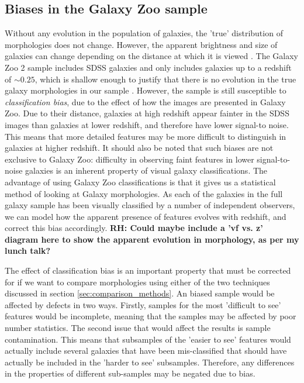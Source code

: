 \documentclass[useAMS,usenatbib]{mn2e}
\newcommand{\rh}[1]{{\bf \textcolor{RoyalPurple}{RH: #1}}}
\begin{document}
\subsection{Biases in the Galaxy Zoo sample}
Without any evolution in the population of galaxies, the 'true' distribution of morphologies does not change. However, the apparent brightness and size of galaxies can change depending on the distance at which it is viewed \citep{Bamford_09}. The Galaxy Zoo 2 sample includes SDSS galaxies and only includes galaxies up to a redshift of $\sim 0.25$, which is shallow enough to justify that there is no evolution in the true galaxy morphologies in our sample \citep{Willett_13}. However, the sample is still susceptible to \textit{classification bias}, due to the effect of how the images are presented in Galaxy Zoo. Due to their distance, galaxies at high redshift appear fainter in the SDSS images than galaxies at lower redshift, and therefore have lower signal-to noise. This means that more detailed features may be more difficult to distinguish in galaxies at higher redshift. It should also be noted that such biases are not exclusive to Galaxy Zoo: difficulty in observing faint features in lower signal-to-noise galaxies is an inherent property of visual galaxy classifications. The advantage of using Galaxy Zoo classifications is that it gives us a statistical method of looking at Galaxy morphologies. As each of the galaxies in the full galaxy sample has been visually classified by a number of independent observers, we can model how the apparent presence of features evolves with redshift, and correct this bias accordingly.  \rh{Could maybe include a 'vf vs. z' diagram here to show the apparent evolution in morphology, as per my lunch talk?}

The effect of classification bias is an important property that must be corrected for if we want to compare morphologies using either of the two techniques discussed in section \ref{sec:comparison_methods}. An biased sample would be affected by defects in two ways. Firstly, samples for the most 'difficult to see' features would be incomplete, meaning that the samples may be affected by poor number statistics. The second issue that would affect the results is sample contamination. This means that subsamples of the 'easier to see' features would actually include several galaxies that have been mis-classified that should have actually be included in the 'harder to see' subsamples. Therefore, any differences in the properties of different sub-samples may be negated due to bias.
\end{document}
